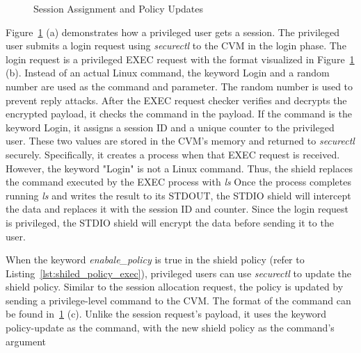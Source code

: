 \begin{figure}[!htb]
\begin{minipage}{0.9\textwidth}
\begin{subcolumns}[0.62\textwidth]
    \nextsubfigure
    \end{subcolumns}
    \end{minipage}
    
    \caption[Session Assignment and Policy Updates]{Session Assignment and Policy Updates}
    \label{fig:session_policy}
\end{figure}


Figure~\ref{fig:session_policy} (a) demonstrates how a privileged user gets a session. The privileged user submits a login request using \emph{securectl} to the \acrshort{CVM} in the login phase. The login request is a privileged EXEC request with the format visualized in Figure~\ref{fig:session_policy} (b). Instead of an actual Linux command, the keyword Login and a random number 
are used as the command and parameter. The random number is used to prevent reply attacks. After the EXEC request checker verifies and decrypts the encrypted payload, it checks the command in the payload. If the command is the keyword Login, it assigns a session ID and a unique counter to the privileged user. 
These two values are stored in the \acrshort{CVM}'s memory and returned to \emph{securectl} securely. Specifically, it creates a process when that EXEC request is received. However, the keyword "Login" is not a Linux command. Thus, the shield replaces the command executed by the EXEC process with \emph{ls} Once the process 
completes running \emph{ls} and writes the result to its STDOUT, the STDIO shield will intercept the data and replaces it with the session ID and counter. Since the login request is privileged, the STDIO shield will encrypt the data before sending it to the user. 

When the keyword \emph{enabale\_policy} is true in the shield policy (refer to Listing~\ref{lst:shiled_policy_exec}), privileged users can use \emph{securectl} to update the shield policy. Similar to the session allocation request, the policy is updated by sending a privilege-level command to the \acrshort{CVM}. The format of the command can be found 
in~\ref{fig:session_policy} (c). Unlike the session request's payload, it uses the keyword policy-update as the command, with the new shield policy as the command's argument

